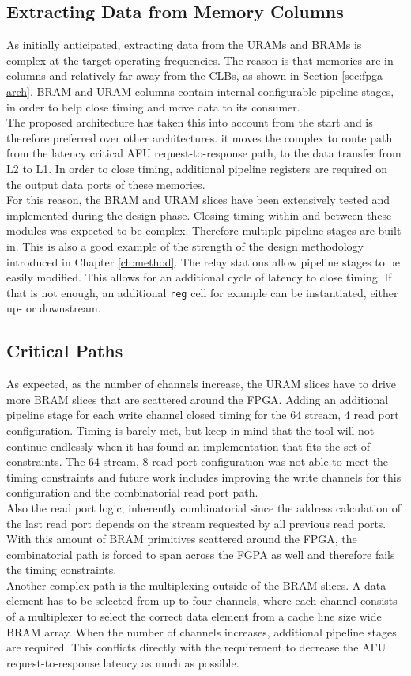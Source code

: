 \subsection{Extracting Data from Memory Columns}
As initially anticipated, extracting data from the URAMs and BRAMs is complex at the target operating frequencies. The reason is that memories are in columns and relatively far away from the CLBs, as shown in Section \ref{sec:fpga-arch}. BRAM and URAM columns contain internal configurable pipeline stages, in order to help close timing and move data to its consumer.\\
The proposed architecture has taken this into account from the start and is therefore preferred over other architectures. it moves the complex to route path from the latency critical AFU request-to-response path, to the data transfer from L2 to L1. In order to close timing, additional pipeline registers are required on the output data ports of these memories.\\
For this reason, the BRAM and URAM slices have been extensively tested and implemented during the design phase. Closing timing within and between these modules was expected to be complex. Therefore multiple pipeline stages are built-in. This is also a good example of the strength of the design methodology introduced in Chapter \ref{ch:method}. The relay stations allow pipeline stages to be easily modified. This allows for an additional cycle of latency to close timing. If that is not enough, an additional \texttt{reg} cell for example can be instantiated, either up- or downstream.

\subsection{Critical Paths}
As expected, as the number of channels increase, the URAM slices have to drive more BRAM slices that are scattered around the FPGA. Adding an additional pipeline stage for each write channel closed timing for the 64 stream, 4 read port configuration. Timing is barely met, but keep in mind that the tool will not continue endlessly when it has found an implementation that fits the set of constraints. The 64 stream, 8 read port configuration was not able to meet the timing constraints and future work includes improving the write channels for this configuration and the combinatorial read port path.\\
Also the read port logic, inherently combinatorial since the address calculation of the last read port depends on the stream requested by all previous read ports. With this amount of BRAM primitives scattered around the FPGA, the combinatorial path is forced to span across the FGPA as well and therefore fails the timing constraints.\\
Another complex path is the multiplexing outside of the BRAM slices. A data element has to be selected from up to four channels, where each channel consists of a multiplexer to select the correct data element from a cache line size wide BRAM array. When the number of channels increases, additional pipeline stages are required. This conflicts directly with the requirement to decrease the AFU request-to-response latency as much as possible.

